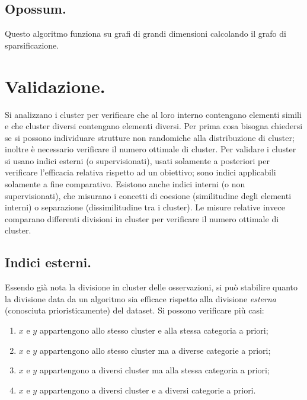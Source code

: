 \documentclass[11pt, a4page, twocolumn]{article}
\begin{document}
\subsection{Opossum.}
Questo algoritmo funziona su grafi di grandi dimensioni calcolando il grafo di sparsificazione.


\section{Validazione.}
Si analizzano i cluster per verificare che al loro interno contengano elementi simili e che cluster diversi contengano elementi diversi.
Per prima cosa bisogna chiedersi se si possono individuare strutture non randomiche alla distribuzione di cluster; inoltre è necessario verificare il numero ottimale di cluster.
Per validare i cluster si usano indici esterni (o supervisionati), usati solamente a posteriori per verificare l'efficacia relativa rispetto ad un obiettivo; sono indici applicabili solamente a fine comparativo.
Esistono anche indici interni (o non supervisionati), che misurano i concetti di coesione (similitudine degli elementi interni) o separazione (dissimilitudine tra i cluster).
Le misure relative invece comparano differenti divisioni in cluster per verificare il numero ottimale di cluster.

\subsection{Indici esterni.}
Essendo già nota la divisione in cluster delle osservazioni, si può stabilire quanto la divisione data da un algoritmo sia efficace rispetto alla divisione \textit{esterna} (conosciuta prioristicamente) del dataset.
Si possono verificare più casi:
\begin{enumerate}[label=(\alph*)]
\item $x$ e $y$ appartengono allo stesso cluster e alla stessa categoria a priori;
\item $x$ e $y$ appartengono allo stesso cluster ma a diverse categorie a priori;
\item $x$ e $y$ appartengono a diversi cluster ma alla stessa categoria a priori;
\item $x$ e $y$ appartengono a diversi cluster e a diversi categorie a priori.
\end{enumerate}
\end{document}
